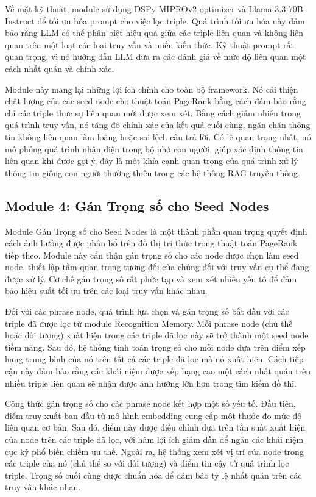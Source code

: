 \documentclass[../main.tex]{subfiles}
\begin{document}
Về mặt kỹ thuật, module sử dụng DSPy MIPROv2 optimizer và Llama-3.3-70B-Instruct để tối ưu hóa prompt cho việc lọc triple. Quá trình tối ưu hóa này đảm bảo rằng LLM có thể phân biệt hiệu quả giữa các triple liên quan và không liên quan trên một loạt các loại truy vấn và miền kiến thức. Kỹ thuật prompt rất quan trọng, vì nó hướng dẫn LLM đưa ra các đánh giá về mức độ liên quan một cách nhất quán và chính xác.

Module này mang lại những lợi ích chính cho toàn bộ framework. Nó cải thiện chất lượng của các seed node cho thuật toán PageRank bằng cách đảm bảo rằng chỉ các triple thực sự liên quan mới được xem xét. Bằng cách giảm nhiễu trong quá trình truy vấn, nó tăng độ chính xác của kết quả cuối cùng, ngăn chặn thông tin không liên quan làm loãng hoặc sai lệch câu trả lời. Có lẽ quan trọng nhất, nó mô phỏng quá trình nhận diện trong bộ nhớ con người, giúp xác định thông tin liên quan khi được gợi ý, đây là một khía cạnh quan trọng của quá trình xử lý thông tin giống con người thường thiếu trong các hệ thống RAG truyền thống.

\subsection{Module 4: Gán Trọng số cho Seed Nodes}
Module Gán Trọng số cho Seed Nodes là một thành phần quan trọng quyết định cách ảnh hưởng được phân bổ trên đồ thị tri thức trong thuật toán PageRank tiếp theo. Module này cẩn thận gán trọng số cho các node được chọn làm seed node, thiết lập tầm quan trọng tương đối của chúng đối với truy vấn cụ thể đang được xử lý. Cơ chế gán trọng số rất phức tạp và xem xét nhiều yếu tố để đảm bảo hiệu suất tối ưu trên các loại truy vấn khác nhau.

Đối với các phrase node, quá trình lựa chọn và gán trọng số bắt đầu với các triple đã được lọc từ module Recognition Memory. Mỗi phrase node (chủ thể hoặc đối tượng) xuất hiện trong các triple đã lọc này sẽ trở thành một seed node tiềm năng. Sau đó, hệ thống tính toán trọng số cho mỗi node dựa trên điểm xếp hạng trung bình của nó trên tất cả các triple đã lọc mà nó xuất hiện. Cách tiếp cận này đảm bảo rằng các khái niệm được xếp hạng cao một cách nhất quán trên nhiều triple liên quan sẽ nhận được ảnh hưởng lớn hơn trong tìm kiếm đồ thị.

Công thức gán trọng số cho các phrase node kết hợp một số yếu tố. Đầu tiên, điểm truy xuất ban đầu từ mô hình embedding cung cấp một thước đo mức độ liên quan cơ bản. Sau đó, điểm này được điều chỉnh dựa trên tần suất xuất hiện của node trên các triple đã lọc, với hàm lợi ích giảm dần để ngăn các khái niệm cực kỳ phổ biến chiếm ưu thế. Ngoài ra, hệ thống xem xét vị trí của node trong các triple của nó (chủ thể so với đối tượng) và điểm tin cậy từ quá trình lọc triple. Trọng số cuối cùng được chuẩn hóa để đảm bảo tỷ lệ nhất quán trên các truy vấn khác nhau.
\end{document}
